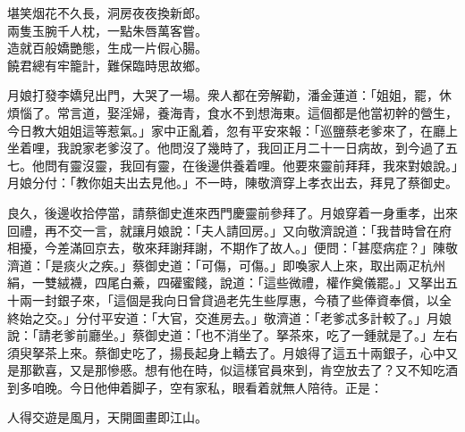 \begin{myquote}
堪笑烟花不久長，洞房夜夜換新郎。\\兩隻玉腕千人枕，一點朱唇萬客嘗。\\造就百般嬌艷態，生成一片假心腸。\\饒君總有牢籠計，難保臨時思故鄉。
\end{myquote}

月娘打發李嬌兒出門，大哭了一場。衆人都在旁解勸，潘金蓮道：「姐姐，罷，休煩惱了。常言道，娶淫婦，養海青，食水不到想海東。這個都是他當初幹的營生，今日教大姐姐這等惹氣。」家中正亂着，忽有平安來報：「巡鹽蔡老爹來了，在廳上坐着哩，我說家老爹沒了。他問沒了幾時了，我回正月二十一日病故，到今過了五七。他問有靈沒靈，我回有靈，在後邊供養着哩。他要來靈前拜拜，我來對娘說。」月娘分付：「教你姐夫出去見他。」不一時，陳敬濟穿上孝衣出去，拜見了蔡御史。

良久，後邊收拾停當，請蔡御史進來西門慶靈前參拜了。月娘穿着一身重孝，出來回禮，再不交一言，就讓月娘說：「夫人請回房。」又向敬濟說道：「我昔時曾在府相擾，今差滿回京去，敬來拜謝拜謝，不期作了故人。」便問：「甚麼病症？」陳敬濟道：「是痰火之疾。」蔡御史道：「可傷，可傷。」即喚家人上來，取出兩疋杭州絹，一雙絨襪，四尾白鯗，四礶蜜餞，說道：「這些微禮，權作奠儀罷。」又拏出五十兩一封銀子來，「這個是我向日曾貸過老先生些厚惠，今積了些俸資奉償，以全終始之交。」{}分付平安道：「大官，交進房去。」敬濟道：「老爹忒多計較了。」月娘說：「請老爹前廳坐。」蔡御史道：「也不消坐了。拏茶來，吃了一鍾就是了。」左右須臾拏茶上來。蔡御史吃了，揚長起身上轎去了。月娘得了這五十兩銀子，心中又是那歡喜，又是那慘慼。想有他在時，似這樣官員來到，肯空放去了？又不知吃酒到多咱晚。今日他伸着脚子，空有家私，眼看着就無人陪待。正是：

\begin{myquote}
人得交遊是風月，天開圖畫即江山。
\end{myquote}

